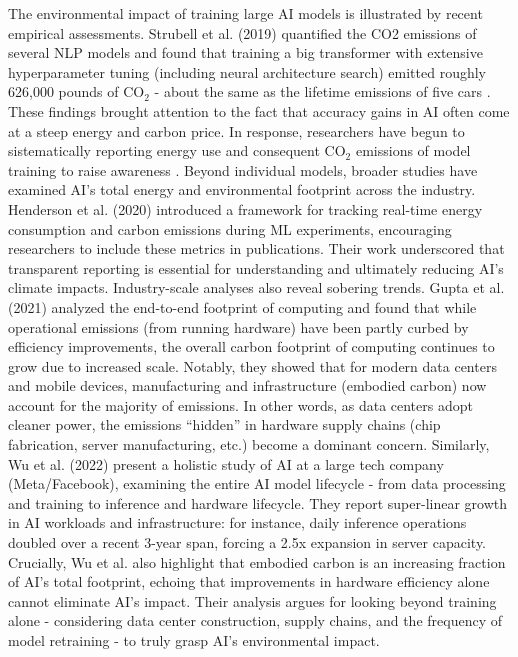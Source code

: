 \documentclass[a4paper,singleside,12pt]{report} %
\begin{document}
The environmental impact of training large AI models is illustrated by recent empirical assessments. 
Strubell et al. (2019) quantified the CO2 emissions of several NLP models and found that training a big
transformer with extensive hyperparameter tuning (including neural architecture search) emitted roughly 
626,000 pounds of $\mathrm{CO_2}$ - about the same as the lifetime emissions of five cars \cite{strubell2019energy}
\cite{dodge2022carbon}. These findings brought attention to the fact that accuracy gains in AI often come 
at a steep energy and carbon price. In response, researchers have begun to sistematically reporting energy
use and consequent $\mathrm{CO_2}$ emissions of model training to raise awareness \cite{dodge2022carbon} 
\cite{patterson2021carbon}. Beyond individual models, broader studies have examined AI's total energy and 
environmental footprint across the industry. Henderson et al. (2020) \cite{henderson2020carbon} introduced 
a framework for tracking real-time energy consumption and carbon emissions during ML experiments, encouraging
researchers to include these metrics in publications. Their work underscored that transparent reporting 
is essential for understanding and ultimately reducing AI's climate impacts. Industry-scale analyses also 
reveal sobering trends. Gupta et al. (2021) \cite{gupta2020carbon} analyzed the end-to-end footprint of 
computing and found that while operational emissions (from running hardware) have been partly curbed by 
efficiency improvements, the overall carbon footprint of computing continues to grow due to increased scale. 
Notably, they showed that for modern data centers and mobile devices, manufacturing and infrastructure 
(embodied carbon) now account for the majority of emissions. In other words, as data centers adopt cleaner 
power, the emissions “hidden” in hardware supply chains (chip fabrication, server manufacturing, etc.) 
become a dominant concern. Similarly, Wu et al. (2022) \cite{wu2021sustainableai} present a holistic study 
of AI at a large tech company (Meta/Facebook), examining the entire AI model lifecycle - from data processing 
and training to inference and hardware lifecycle. They report super-linear growth in AI workloads and 
infrastructure: for instance, daily inference operations doubled over a recent 3-year span, forcing a 2.5x
expansion in server capacity. Crucially, Wu et al. also highlight that embodied carbon is an increasing 
fraction of AI's total footprint, echoing that improvements in hardware efficiency alone cannot eliminate
AI's impact. Their analysis argues for looking beyond training alone - considering data center construction, 
supply chains, and the frequency of model retraining - to truly grasp AI's environmental impact.
\end{document}

